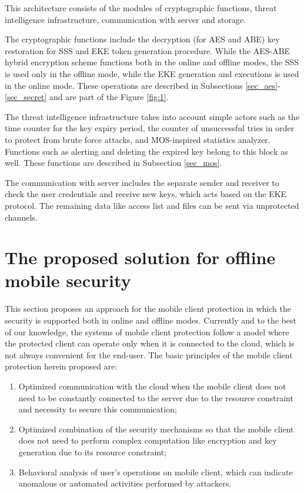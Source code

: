 \documentclass[twocolumn]{svjour3}          	%
\begin{document}
This architecture consists of the modules of cryptographic functions, threat intelligence infrastructure, communication with server and storage.

The cryptographic functions include the decryption (for AES and ABE) key restoration for SSS and EKE token generation procedure. While the AES-ABE hybrid encryption scheme functions both in the online and offline modes, the SSS is used only in the offline mode, while the EKE generation and executions is used in the online mode. These operations are described in Subsections \ref{sec_aes}-\ref{sec_secret} and are part of the Figure \ref{fig:1}.

The threat intelligence infrastructure takes into account simple actors such as the time counter for the key expiry period, the counter of unsuccessful tries in order to protect from brute force attacks, and MOS-inspired statistics analyzer. Functions such as alerting and deleting the expired key belong to this block as well. These functions are described in Subsection \ref{sec_mos}.

The communication with server includes the separate sender and receiver to check the user credentials and receive new keys, which acts based on the EKE protocol. The remaining data like access list and files can be sent via unprotected channels. 

\section{The proposed solution for offline mobile security}
\label{sec_offline_mode}
This section proposes an approach for the mobile client protection in which the security is supported both in online and offline modes. Currently and to the best of our knowledge, the systems of mobile client protection follow a model where the protected client can operate only when it is connected to the cloud, which is not always convenient for the end-user. The basic principles of the mobile client protection herein proposed are: 

\begin{enumerate}
	\item Optimized communication with the cloud when the mobile client does not need to be constantly connected to the server due to the resource constraint and necessity to secure this communication;
	\item Optimized combination of the security mechanisms so that the mobile client does not need to perform complex computation like encryption and key generation due to its resource constraint;
	\item Behavioral analysis of user's operations on mobile client, which can indicate anomalous or automated activities performed by attackers.
\end{enumerate}
\end{document}
